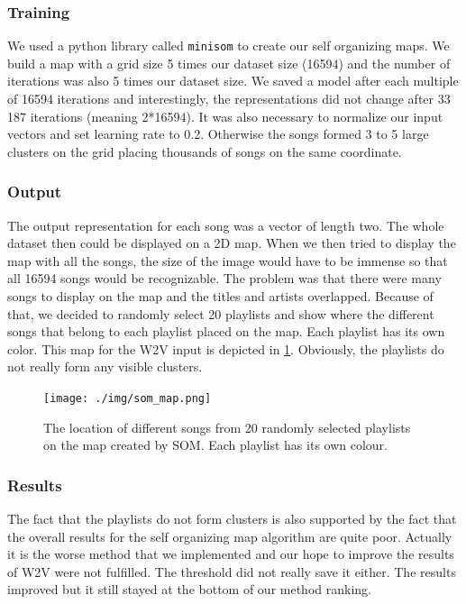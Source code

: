 \subsubsection{Training}
We used a python library called \texttt{minisom} \cite{Vettigli2019} to create our self organizing maps. We build a map with a grid size 5 times our dataset size (16594) and the number of iterations was also 5 times our dataset size. We saved a model after each multiple of 16594 iterations and interestingly, the representations did not change after 33 187 iterations (meaning 2*16594). It was also necessary to normalize our input vectors and set learning rate to 0.2. Otherwise the songs formed 3 to 5 large clusters on the grid placing thousands of songs on the same coordinate. 
\subsubsection{Output}
The output representation for each song was a vector of length two. The whole dataset then could be displayed on a 2D map. 
When we then tried to display the map with all the songs, the size of the image would have to be immense so that all 16594 songs would be recognizable. The problem was that there were many songs to display on the map and the titles and artists overlapped. Because of that, we decided to randomly select 20 playlists and show where the different songs that belong to each playlist placed on the map. Each playlist has its own color. This map for the W2V input is depicted in \ref{fig:som_map}. Obviously, the playlists do not really form any visible clusters.
\begin{figure}[h]
    \centering
	\texttt{[image: ./img/som\_map.png]}
	\caption{The location of different songs from 20 randomly selected playlists on the map created by SOM. Each playlist has its own colour.}
	\label{fig:som_map}
\end{figure}
\subsubsection{Results}
The fact that the playlists do not form clusters is also supported by the fact that the overall results for the self organizing map algorithm are quite poor. Actually it is the worse method that we implemented and our hope to improve the results of W2V were not fulfilled. The threshold did not really save it either. The results improved but it still stayed at the bottom of our method ranking.

